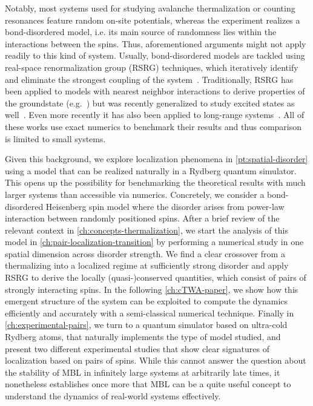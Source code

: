 Notably, most systems used for studying avalanche thermalization or counting resonances feature random on-site potentials, whereas the experiment realizes a bond-disordered model, i.e. its main source of randomness lies within the interactions between the spins. Thus, aforementioned arguments might not apply readily to this kind of system. Usually, bond-disordered models are tackled using real-space renormalization group (RSRG) techniques, which iteratively identify and eliminate the strongest coupling of the system~\cite{igloiStrongDisorderRG2005,parameswaranEigenstatePhaseTransitions2017,igloiStrongDisorderRG2018,monthusStrongDisorderRenormalization2018}. Traditionally, RSRG has been applied to models with nearest neighbor interactions to derive properties of the groundstate (e.g.~\cite{dasguptaLowtemperaturePropertiesRandom1980,fisherRandomTransverseField1992,voskManybodyLocalizationOne2013}) but was recently generalized to study excited states as well~\cite{pekkerHilbertGlassTransitionNew2014}. Even more recently it has also been applied to long-range systems~\cite{moureManyBodyLocalizationTransition2015,moureDisorderedQuantumSpin2018,mohdebEntanglementPropertiesDisordered2020,mohdebExcitedEigenstateEntanglementProperties2022,mohdebGlobalQuenchDynamics2023}. All of these works use exact numerics to benchmark their results and thus comparison is limited to small systems.

Given this background, we explore localization phenomena in \autoref{pt:spatial-disorder} using a model that can be realized naturally in a Rydberg quantum simulator.  This opens up the possibility for benchmarking the theoretical results with much larger systems than accessible via numerics. Concretely, we consider a bond-disordered Heisenberg spin model where the disorder arises from power-law interaction between randomly positioned spins. 
After a brief review of the relevant context in \autoref{ch:concepts-thermalization}, we start the analysis of this model in \autoref{ch:pair-localization-transition} by performing a numerical study in one spatial dimension across disorder strength. We find a clear crossover from a thermalizing into a localized regime at sufficiently strong disorder and apply RSRG to derive the locally (quasi-)conserved quantities, which consist of pairs of strongly interacting spins. In the following \autoref{ch:cTWA-paper}, we show how this emergent structure of the system can be exploited to compute the dynamics efficiently and accurately with a semi-classical numerical technique. Finally in \autoref{ch:experimental-pairs}, we turn to a quantum simulator based on ultra-cold Rydberg atoms, that naturally implements the type of model studied, and present two different experimental studies that show clear signatures of localization based on pairs of spins. 
While this cannot answer the question about the stability of MBL in infinitely large systems at arbitrarily late times, it nonetheless establishes once more that MBL can be a quite useful concept to understand the dynamics of real-world systems effectively.

